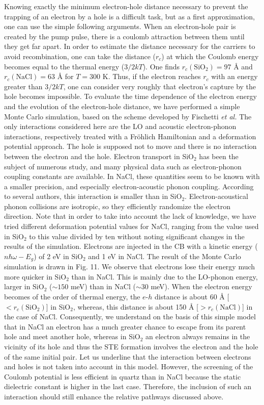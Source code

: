 \documentclass[aps,prb,reprint]{revtex4-2}
\begin{document}
Knowing exactly the minimum electron-hole distance necessary to prevent the trapping of an electron by a hole is a difficult task, but as a first approximation, one can use the simple following arguments. When an electron-hole pair is created by the pump pulse, there is a coulomb attraction between them until they get far apart. In order to estimate the distance necessary for the carriers to avoid recombination, one can take the distance ($r_c$) at which the Coulomb energy becomes equal to the thermal energy ($3/2 kT$). One finds $r_c(\text{SiO}_2) = 97$ \AA{} and $r_c(\text{NaCl}) = 63$ \AA{} for $T = 300$ K. Thus, if the electron reaches $r_c$ with an energy greater than $3/2 kT$, one can consider very roughly that electron's capture by the hole becomes impossible.\cite{32} To evaluate the time dependence of the electron energy and the evolution of the electron-hole distance, we have performed a simple Monte Carlo simulation, based on the scheme developed by Fischetti \textit{et al.}\cite{33} The only interactions considered here are the LO and acoustic electron-phonon interactions, respectively treated with a Fr\"ohlich Hamiltonian and a deformation potential approach. The hole is supposed not to move and there is no interaction between the electron and the hole. Electron transport in SiO$_2$ has been the subject of numerous study, and many physical data such as electron-phonon coupling constants are available.\cite{33,23,34} In NaCl, these quantities seem to be known with a smaller precision, and especially electron-acoustic phonon coupling. According to several authors,\cite{35,36} this interaction is smaller than in SiO$_2$. Electron-acoustical phonon collisions are isotropic, so they efficiently randomize the electron direction. Note that in order to take into account the lack of knowledge, we have tried different deformation potential values for NaCl, ranging from the value used in SiO$_2$ to this value divided by ten without noting significant changes in the results of the simulation. Electrons are injected in the CB with a kinetic energy ($n\hbar\omega - E_g$) of 2 eV in SiO$_2$ and 1 eV in NaCl. The result of the Monte Carlo simulation is drawn in Fig. 11. We observe that electrons lose their energy much more quicker in SiO$_2$ than in NaCl. This is mainly due to the LO-phonon energy, larger in SiO$_2$ ($\sim 150$ meV) than in NaCl ($\sim 30$ meV). When the electron energy becomes of the order of thermal energy, the $e$-$h$ distance is about 60 \AA{} [$< r_c(\text{SiO}_2)$] in SiO$_2$, whereas, this distance is about 150 \AA{} [$> r_c(\text{NaCl})$] in the case of NaCl. Consequently, we understand on the basis of this simple model that in NaCl an electron has a much greater chance to escape from its parent hole and meet another hole, whereas in SiO$_2$ an electron always remains in the vicinity of its hole and thus the STE formation involves the electron and the hole of the same initial pair. Let us underline that the interaction between electrons and holes is not taken into account in this model. However, the screening of the Coulomb potential is less efficient in quartz than in NaCl because the static dielectric constant is higher in the last case. Therefore, the inclusion of such an interaction should still enhance the relative pathways discussed above.
\end{document}
